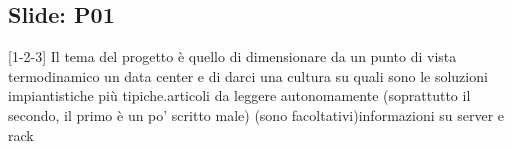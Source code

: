 \subsection{Slide: P01}
[1-2-3] Il tema del progetto è quello di dimensionare da un punto di vista termodinamico un data center e di darci una cultura su quali sono le soluzioni impiantistiche più tipiche.\newline
[4] articoli da leggere autonomamente (soprattutto il secondo, il primo è un po' scritto male) (sono facoltativi)\newline
[5] informazioni su server e rack